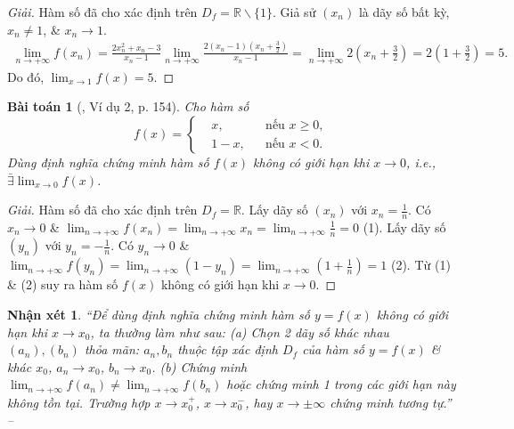 \documentclass{article}
\newtheorem{baitoan}{Bài toán}
\newtheorem{nhanxet}{Nhận xét}
\begin{document}
\begin{proof}[Giải]
	Hàm số đã cho xác định trên $D_f = \mathbb{R}\backslash\{1\}$. Giả sử $(x_n)$ là dãy số bất kỳ, $x_n\ne1$, \& $x_n\to1$.
	\begin{align*}
		\lim_{n\to+\infty} f(x_n) = \frac{2x_n^2 + x_n - 3}{x_n - 1} \lim_{n\to+\infty} \frac{2(x_n - 1)\left(x_n + \frac{3}{2}\right)}{x_n - 1} = \lim_{n\to+\infty} 2\left(x_n + \frac{3}{2}\right) = 2\left(1 + \frac{3}{2}\right) = 5.
	\end{align*}
	Do đó, $\lim_{x\to1} f(x) = 5$.
\end{proof}

\begin{baitoan}[\cite{SBT_Toan_11_dai_so_giai_tich_co_ban}, Ví dụ 2, p. 154]
	Cho hàm số
	\begin{equation*}
		f(x) = \left\{\begin{split}
			&x,&&\mbox{nếu }x\ge0,\\
			&1 - x,&&\mbox{nếu }x < 0.
		\end{split}\right.
	\end{equation*}
	Dùng định nghĩa chứng minh hàm số $f(x)$ không có giới hạn khi $x\to0$, i.e., $\bar\exists\lim_{x\to0} f(x)$.
\end{baitoan}

\begin{proof}[Giải]
	Hàm số đã cho xác định trên $D_f = \mathbb{R}$. Lấy dãy số $(x_n)$ với $x_n = \frac{1}{n}$. Có $x_n\to0$ \& $\lim_{n\to+\infty} f(x_n) = \lim_{n\to+\infty} x_n = \lim_{n\to+\infty} \frac{1}{n} = 0$ (1). Lấy dãy số $(y_n)$ với $y_n = -\frac{1}{n}$. Có $y_n\to0$ \& $\lim_{n\to+\infty} f(y_n) = \lim_{n\to+\infty} (1 - y_n) = \lim_{n\to+\infty} \left(1 + \frac{1}{n}\right) = 1$ (2). Từ (1) \& (2) suy ra hàm số $f(x)$ không có giới hạn khi $x\to0$.
\end{proof}

\begin{nhanxet}
	``Để dùng định nghĩa chứng minh hàm số $y = f(x)$ không có giới hạn khi $x\to x_0$, ta thường làm như sau: (a) Chọn 2 dãy số khác nhau $(a_n),(b_n)$ thỏa mãn: $a_n,b_n$ thuộc tập xác định $D_f$ của hàm số $y = f(x)$ \& khác $x_0$, $a_n\to x_0$, $b_n\to x_0$. (b) Chứng minh $\lim_{n\to+\infty} f(a_n)\ne\lim_{n\to+\infty} f(b_n)$ hoặc chứng minh 1 trong các giới hạn này không tồn tại. Trường hợp $x\to x_0^+$, $x\to x_0^-$, hay $x\to\pm\infty$ chứng minh tương tự.'' -- \cite[pp. 154--155]{SBT_Toan_11_dai_so_giai_tich_co_ban}
\end{nhanxet}
\end{document}
